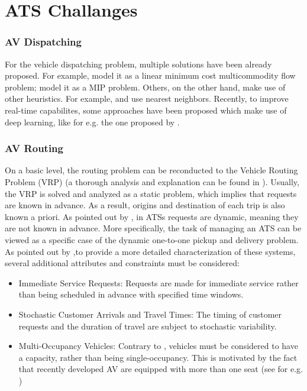 \section{ATS Challanges}\label{sec:ats_challenges}

\subsubsection*{AV Dispatching}
For the vehicle dispatching problem, multiple solutions have been already proposed. For example,  model it as a linear minimum cost multicommodity flow problem;  model it as a MIP problem. Others, on the other hand, make use of other heuristics. For example,  and  use nearest neighbors. Recently, to improve real-time capabilites, some approaches have been proposed which make use of deep learning, like for e.g. the one proposed by .\\

\subsubsection*{AV Routing}
On a basic level, the routing problem can be reconducted to the Vehicle Routing Problem (VRP) (a thorough analysis and explanation can be found in \cite{doi:10.1137/1.9780898718515}). Usually, the VRP is solved and analyzed as a static problem, which implies that requests are known in advance. As a result, origins and destination of each trip is also known a priori. As pointed out by , in ATSs requests are dynamic, meaning they are not known in advance. More specifically, the task of managing an ATS can be viewed as a specific case of the dynamic one-to-one pickup and delivery problem. As pointed out by ,to provide a more detailed characterization of these systems, several additional attributes and constraints must be considered:
\begin{itemize}
	\item Immediate Service Requests: Requests are made for immediate service rather than being scheduled in advance with specified time windows.
	\item Stochastic Customer Arrivals and Travel Times: The timing of customer requests and the duration of travel are subject to stochastic variability.
	\item Multi-Occupancy Vehicles: Contrary to \cite{zhang2016}, vehicles must be considered to have a capacity, rather than being single-occupancy. This is motivated by the fact that recently developed AV are equipped with more than one seat (see for e.g. \cite{dlr-nemo-bili})
\end{itemize}


